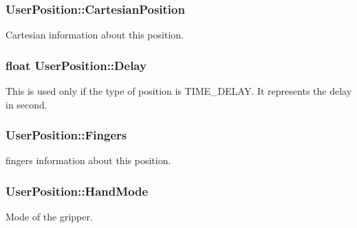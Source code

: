 \subsubsection[{\texorpdfstring{Cartesian\+Position}{CartesianPosition}}]{ User\+Position\+::\+Cartesian\+Position}\hypertarget{struct_user_position_ab363c40971853637f728978e604c438f}{}\label{struct_user_position_ab363c40971853637f728978e604c438f}


Cartesian information about this position. 

\subsubsection[{\texorpdfstring{Delay}{Delay}}]{\setlength{\rightskip}{0pt plus 5cm}float User\+Position\+::\+Delay}\hypertarget{struct_user_position_aa18896c1238a50c8ad81c66dfd76ac5e}{}\label{struct_user_position_aa18896c1238a50c8ad81c66dfd76ac5e}


This is used only if the type of position is T\+I\+M\+E\+\_\+\+D\+E\+L\+AY. It represents the delay in second. 

\subsubsection[{\texorpdfstring{Fingers}{Fingers}}]{ User\+Position\+::\+Fingers}\hypertarget{struct_user_position_a727907bb6a98b0f3d10aaa8011b67927}{}\label{struct_user_position_a727907bb6a98b0f3d10aaa8011b67927}


fingers information about this position. 

\subsubsection[{\texorpdfstring{Hand\+Mode}{HandMode}}]{ User\+Position\+::\+Hand\+Mode}\hypertarget{struct_user_position_a83779902810d0e5e16d533e0f964c0df}{}\label{struct_user_position_a83779902810d0e5e16d533e0f964c0df}


Mode of the gripper. 

